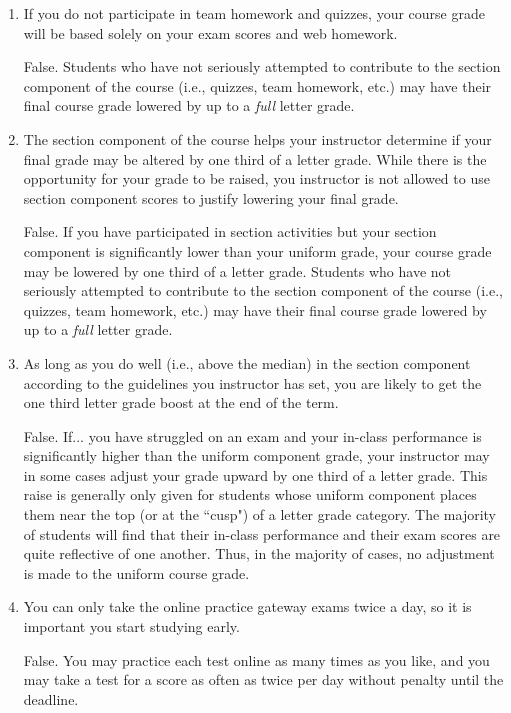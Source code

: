 \documentclass[11pt,letterpaper]{article}
\begin{document}
\begin{enumerate}
\item If you do not participate in team homework and quizzes, your course grade will be based solely on your exam scores and web homework.

\vspace{.5pc}
False.  Students who have not seriously attempted to contribute to the section component of the course (i.e., quizzes, team homework, etc.) may have their final course grade lowered by up to a \emph{full} letter grade.

\item The section component of the course helps your instructor determine if your final grade may be altered by one third of a letter grade.  While there is the opportunity for your grade to be raised, you instructor is not allowed to use section component scores to justify lowering your final grade.

\vspace{.5pc}
False.  If you have participated in section activities but your section component is significantly lower than your uniform grade, your course grade may be lowered by one third of a letter grade.  Students who have not seriously attempted to contribute to the section component of the course (i.e., quizzes, team homework, etc.) may have their final course grade lowered by up to a {\em full} letter grade.

\item As long as you do well (i.e., above the median) in the section component according to the guidelines you instructor has set, you are likely to get the one third letter grade boost at the end of the term. 

\vspace{.5pc}
False.  If... you have struggled on an exam and your in-class performance is significantly higher than the uniform component grade, your instructor may in some cases adjust your grade upward by one third of a letter grade.  This raise is generally only given for students whose uniform component places them near the top (or at the ``cusp") of a letter grade category.  The majority of students will find that their in-class performance and their exam scores are quite reflective of one another.  Thus, in the majority of cases, no adjustment is made to the uniform course grade.

\item You can only take the online practice gateway exams twice a day, so it is important you start studying early.

\vspace{.5pc}
False.  You may practice each test online as many times as you like, and you may take a test for a score as often as twice per day without penalty until the deadline.


\end{enumerate}
\end{document}
